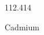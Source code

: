 \documentclass[12pt]{article}
\begin{document}
\hfill{}
\vfill
\begin{center}
  {\fontsize{50}{60}
  }

  112.414

Cadmium
\end{center}
\vfill
\end{document}
